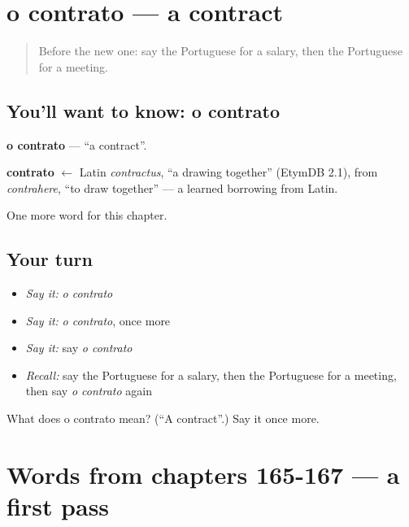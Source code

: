 \section[o contrato]{o contrato — a contract}

\label{lesson:PT-C170-contrato}



\begin{quote}
Before the new one: say the Portuguese for a salary, then the Portuguese for a meeting.
\end{quote}

\subsection*{You'll want to know: o contrato}
\textbf{o contrato} — \textquotedblleft{}a contract\textquotedblright{}.

\begin{cousinweb}
\textbf{contrato} $\leftarrow$ Latin \emph{contractus}, \textquotedblleft{}a drawing together\textquotedblright{} (EtymDB 2.1), from \emph{contrahere}, \textquotedblleft{}to draw together\textquotedblright{} — a learned borrowing from Latin.
\end{cousinweb}

\begin{grammarlens}[title={What you've built}]
One more word for this chapter.
\end{grammarlens}

\subsection*{Your turn}
\begin{itemize}
\raggedright
  \item \emph{Say it:} \emph{o contrato}
  \item \emph{Say it:} \emph{o contrato}, once more
  \item \emph{Say it:} say \emph{o contrato}
  \item \emph{Recall:} say the Portuguese for a salary, then the Portuguese for a meeting, then say \emph{o contrato} again
\end{itemize}

\begin{tcolorbox}[breakable,colback=teal!4,colframe=teal!35!black,title={Before you move on}]
What does o contrato mean? (\textquotedblleft{}A contract\textquotedblright{}.) Say it once more.
\end{tcolorbox}
\section[(dialogue)]{Words from chapters 165-167 — a first pass}

